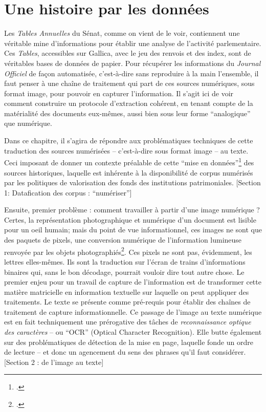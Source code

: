 \chapter[test]{Une histoire par les données}

Les \emph{Tables Annuelles} du Sénat, comme on vient de le voir, contiennent une véritable mine d'informations pour établir une analyse de l'activité parlementaire. Ces \emph{Tables}, accessibles sur Gallica, avec le jeu des renvois et des index, sont de véritables bases de données de papier. Pour récupérer les informations du \emph{Journal Officiel} de façon automatisée, c'est-à-dire sans reproduire à la main l'ensemble, il faut penser à une chaîne de traitement qui part de ces sources numériques, sous format image, pour pouvoir en capturer l'information. Il s'agit ici de voir comment construire un protocole d’extraction cohérent, en tenant compte de la matérialité des documents eux-mêmes, aussi bien sous leur forme \enquote{analogique} que numérique. 

Dans ce chapitre, il s'agira de répondre aux problématiques techniques de cette traduction des sources numérisées -- c'est-à-dire sous format image -- au texte. Ceci imposant de donner un contexte préalable de cette \enquote{mise en données}\footcite[][]{clavert} des sources historiques, laquelle est inhérente à la disponibilité de corpus numérisés par les politiques de valorisation des fonds des institutions patrimoniales. [Section 1: Datafication des corpus : \enquote{numériser}]

Ensuite, premier problème : comment travailler à partir d'une image numérique ? Certes, la représentation photographique et numérique d'un document est lisible pour un oeil humain; mais du point de vue informationnel, ces images ne sont que des paquets de pixels, une conversion numérique de l'information lumineuse renvoyée par les objets photographiés\footcite[][]{claerr}. Ces pixels ne sont pas, évidemment, les lettres elles-mêmes. Ils sont la traduction sur l'écran de trains d'informations binaires qui, sans le bon décodage, pourrait vouloir dire tout autre chose. Le premier enjeu pour un travail de capture de l'information est de transformer cette matière matricielle en information textuelle sur laquelle on peut appliquer des traitements. Le texte se présente comme pré-requis pour établir des chaînes de traitement de capture informationnelle. Ce passage de l'image au texte numérique est en fait techniquement une prérogative des tâches de \emph{reconnaissance optique des caractères} -- ou \enquote{OCR} (Optical Character Recognition). Elle butte également sur des problématiques de détection de la mise en page, laquelle fonde un ordre de lecture -- et donc un agencement du sens des phrases qu'il faut considérer. [Section 2 : de l'image au texte]

